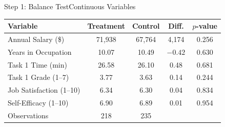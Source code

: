 \documentclass[hyperref={pdfpagelabels=false}]{beamer}
\begin{document}
\begin{frame}{Step 1: Balance Test}{Continuous Variables}
	\begin{center}
		\begin{threeparttable}
			\linespread{1}
			\fontsize{8}{8pt}\selectfont
			\centering
			\begin{tabular}{@{}lcccc@{}}
				\toprule
				Variable & Treatment & Control & Diff. & $p$-value \\
				\midrule\midrule
				Annual Salary (\$) & 71,938 & 67,764 & 4,174 & 0.256 \\
				Years in Occupation & 10.07 & 10.49 & $-0.42$ & 0.630 \\
				Task 1 Time (min) & 26.58 & 26.10 & 0.48 & 0.681 \\
				Task 1 Grade (1--7) & 3.77 & 3.63 & 0.14 & 0.244 \\
				Job Satisfaction (1--10) & 6.34 & 6.30 & 0.04 & 0.834 \\
				Self-Efficacy (1--10) & 6.90 & 6.89 & 0.01 & 0.954 \\
				\midrule\midrule
				Observations & 218 & 235 & & \\
				\bottomrule
			\end{tabular}
		\end{threeparttable}
	\end{center}
\end{frame}
\end{document}
